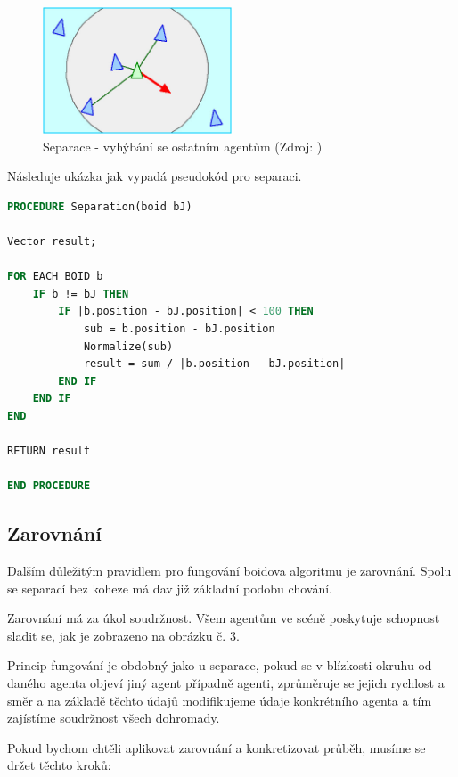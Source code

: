 \documentclass[czech,public,dept460,male,cpdeclaration]{diploma}
\begin{document}
\begin{figure}[H]\centering\includegraphics[width=0.5\textwidth]{Figures/separation.jpg}
	\caption{Separace - vyhýbání se ostatním agentům (Zdroj: \cite{link2})}
\end{figure}

\newpage Následuje ukázka jak vypadá pseudokód pro separaci.

\begin{lstlisting}[language=pascal,label=src:Separation pseudocode,caption=Pseudokód pro separaci]
PROCEDURE Separation(boid bJ)

Vector result;

FOR EACH BOID b
	IF b != bJ THEN
		IF |b.position - bJ.position| < 100 THEN			
			sub = b.position - bJ.position
			Normalize(sub)
			result = sum / |b.position - bJ.position|
		END IF
	END IF
END

RETURN result

END PROCEDURE
\end{lstlisting}

\subsection{Zarovnání}\label{sec:zarovnani}
Dalším důležitým pravidlem pro fungování boidova algoritmu je zarovnání. Spolu se separací bez koheze má dav již základní podobu chování. 

Zarovnání má za úkol soudržnost. Všem agentům ve scéně poskytuje schopnost sladit se, jak je zobrazeno na obrázku č. 3. 

Princip fungování je obdobný jako u separace, pokud se v blízkosti okruhu od daného agenta objeví jiný agent případně agenti, zprůměruje se jejich rychlost a směr a na základě těchto údajů modifikujeme údaje konkrétního agenta a tím zajístíme soudržnost všech dohromady. 

Pokud bychom chtěli aplikovat zarovnání a konkretizovat průběh, musíme se držet těchto kroků:
\end{document}
